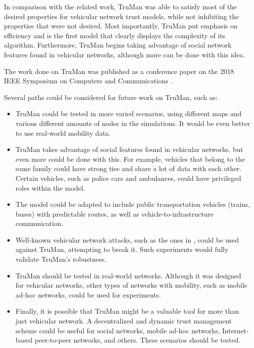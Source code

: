In comparison with the related work, TruMan was able to satisfy most of the desired properties for vehicular network trust models, while not inhibiting the properties that were not desired.
Most importantly, TruMan put emphasis on efficiency and is the first model that clearly displays the complexity of its algorithm.
Furthermore, TruMan begins taking advantage of social network features found in vehicular networks, although more can be done with this idea.

The work done on TruMan was published as a conference paper on the 2018 IEEE Symposium on Computers and Communications \citep{greca2018truman}.

\pagebreak
Several paths could be considered for future work on TruMan, such as:
\begin{itemize}
\item TruMan could be tested in more varied scenarios, using different maps and various different amounts of nodes in the simulations. It would be even better to use real-world mobility data.
\item TruMan takes advantage of social features found in vehicular networks, but even more could be done with this. For example, vehicles that belong to the same family could have strong ties and share a lot of data with each other. Certain vehicles, such as police cars and ambulances, could have privileged roles within the model.
\item The model could be adapted to include public transportation vehicles (trains, buses) with predictable routes, as well as vehicle-to-infrastructure communication.
\item Well-known vehicular network attacks, such as the ones in \citep{isaac2010security}, could be used against TruMan, attempting to break it. Such experiments would fully validate TruMan's robustness.
\item TruMan should be tested in real-world networks. Although it was designed for vehicular networks, other types of networks with mobility, such as mobile ad-hoc networks, could be used for experiments.
\item Finally, it is possible that TruMan might be a valuable tool for more than just vehicular network. A decentralized and dynamic trust management scheme could be useful for social networks, mobile ad-hoc networks, Internet-based peer-to-peer networks, and others. These scenarios should be tested.
\end{itemize}



%
%
%
%
%
%
%
%

